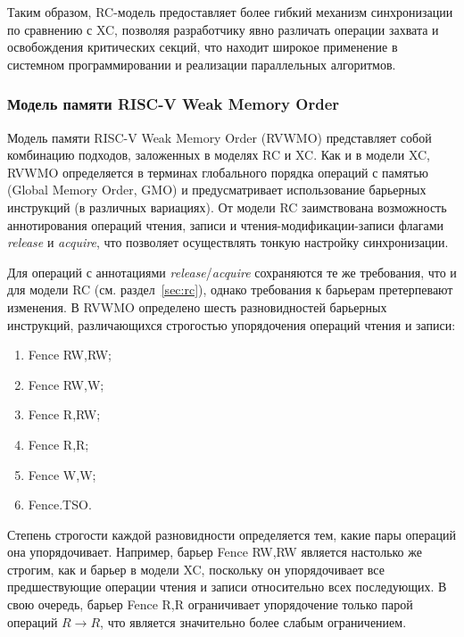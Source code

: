 Таким образом, RC-модель предоставляет более гибкий механизм
синхронизации по сравнению с XC, позволяя разработчику явно различать
операции захвата и освобождения критических секций, что находит
широкое применение в системном программировании и реализации
параллельных алгоритмов.

\subsubsection{Модель памяти RISC-V Weak Memory Order}
\label{sec:ch1/rvvmo}

Модель памяти RISC-V Weak Memory Order (RVWMO) представляет собой
комбинацию подходов, заложенных в моделях RC и XC. Как и в модели XC,
RVWMO определяется в терминах глобального порядка операций с памятью
(Global Memory Order, GMO) и предусматривает использование барьерных
инструкций (в различных вариациях). От модели RC заимствована
возможность аннотирования операций чтения, записи и
чтения-модификации-записи флагами \textit{release} и
\textit{acquire}, что позволяет осуществлять тонкую настройку синхронизации.

Для операций с аннотациями \textit{release}/\textit{acquire}
сохраняются те же требования, что и для модели RC (см.
раздел~\ref{sec:rc}), однако требования к барьерам претерпевают
изменения. В RVWMO определено шесть разновидностей барьерных
инструкций, различающихся строгостью упорядочения операций чтения и записи:

\begin{enumerate}
  \item Fence RW,RW;
  \item Fence RW,W;
  \item Fence R,RW;
  \item Fence R,R;
  \item Fence W,W;
  \item Fence.TSO.
\end{enumerate}

Степень строгости каждой разновидности определяется тем, какие пары
операций она упорядочивает. Например, барьер Fence RW,RW является
настолько же строгим, как и барьер в модели XC, поскольку он
упорядочивает все предшествующие операции чтения и записи
относительно всех последующих. В свою очередь, барьер Fence R,R
ограничивает упорядочение только парой операций $R \rightarrow R$,
что является значительно более слабым ограничением.%

